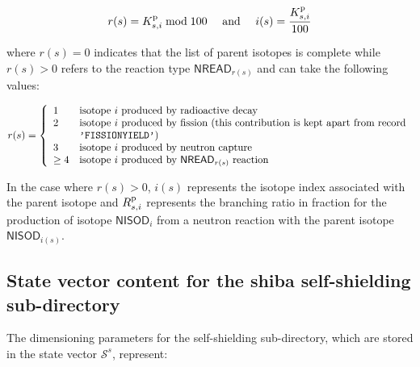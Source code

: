 \begin{equation}
  r(s)=K_{s,i}^{\rm p}\bmod 100 \ \ \ \ {\rm and} \ \ \ \ i(s)={{K_{s,i}^{\rm p}}\over{100}}
\end{equation}

\noindent where $r(s)=0$ indicates that the list of parent isotopes is complete while $r(s)>0$
refers to the reaction type $\mathsf{NREAD}_{r(s)}$ and can take the following values:

\begin{displaymath}
r(s) = \left\{
\begin{array}{ll}
1 & \textrm{isotope $i$ produced by radioactive decay}\\
2 & \textrm{isotope $i$ produced by fission (this contribution is kept apart from record} \\
  & \textrm{{\tt 'FISSIONYIELD'})} \\
3 & \textrm{isotope $i$ produced by neutron capture} \\
\ge 4 & \textrm{isotope $i$ produced by $\mathsf{NREAD}_{r(s)}$ reaction}
\end{array} \right.
\end{displaymath}

In the case where $r(s)>0$, $i(s)$ represents the isotope index associated
with the parent isotope and $R_{s,i}^{\rm p}$ represents the branching
ratio in fraction for the production of isotope $\mathsf{NISOD}_{i}$ from a neutron
reaction with the parent isotope $\mathsf{NISOD}_{i(s)}$.

\goodbreak

\subsection{State vector content for the {\sc shiba} self-shielding sub-directory}\label{sect:ssshibastate}

The dimensioning parameters for the self-shielding sub-directory, which are stored in the state vector
$\mathcal{S}^{s}$, represent:

